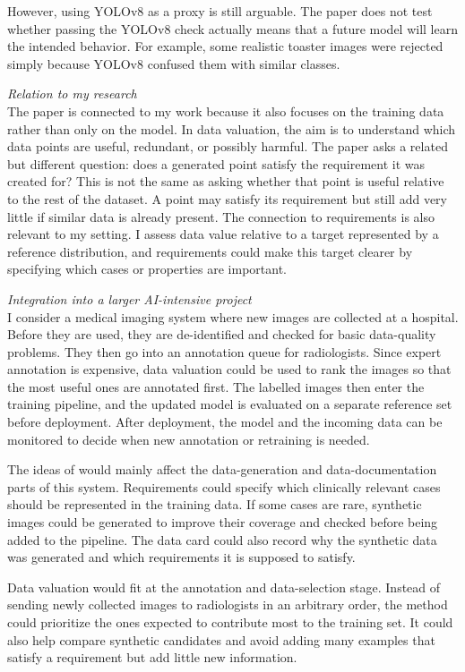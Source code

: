 \documentclass[11pt,a4paper]{article}
\newcommand{\heading}[1]{
  \vspace{.5em}
  \noindent\emph{#1}
}
\begin{document}
However, using YOLOv8 as a proxy is still arguable. The paper does not test whether passing the YOLOv8 check actually means that a future model will learn the intended behavior. For example, some realistic toaster images were rejected simply because YOLOv8 confused them with similar classes.

\heading{Relation to my research}\\
The paper is connected to my work because it also focuses on the training data rather than only on the model. In data valuation, the aim is to understand which data points are useful, redundant, or possibly harmful. The paper asks a related but different question: does a generated point satisfy the requirement it was created for? This is not the same as asking whether that point is useful relative to the rest of the dataset. A point may satisfy its requirement but still add very little if similar data is already present. The connection to requirements is also relevant to my setting. I assess data value relative to a target represented by a reference distribution, and requirements could make this target clearer by specifying which cases or properties are important. 

\heading{Integration into a larger AI-intensive project}\\
I consider a medical imaging system where new images are collected at a hospital. Before they are used, they are de-identified and checked for basic data-quality problems. They then go into an annotation queue for radiologists. Since expert annotation is expensive, data valuation could be used to rank the images so that the most useful ones are annotated first. The labelled images then enter the training pipeline, and the updated model is evaluated on a separate reference set before deployment. After deployment, the model and the incoming data can be monitored to decide when new annotation or retraining is needed.

The ideas of \citet{vonderhaar2025generating} would mainly affect the data-generation and data-documentation parts of this system. Requirements could specify which clinically relevant cases should be represented in the training data. If some cases are rare, synthetic images could be generated to improve their coverage and checked before being added to the pipeline. The data card could also record why the synthetic data was generated and which requirements it is supposed to satisfy.

Data valuation would fit at the annotation and data-selection stage. Instead of sending newly collected images to radiologists in an arbitrary order, the method could prioritize the ones expected to contribute most to the training set. It could also help compare synthetic candidates and avoid adding many examples that satisfy a requirement but add little new information.
\end{document}
